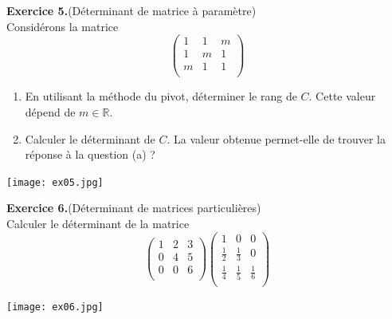 \documentclass[a4paper, 10pt]{report}
\begin{document}
	\noindent
	\textbf{Exercice 5.}(Déterminant de matrice à paramètre)\\
	Considérons la matrice
	\[
	\begin{pmatrix}
		1 & 1 & m\\
		1 & m & 1\\
		m & 1 & 1\\
	\end{pmatrix}
	\]
	\begin{enumerate}[label = (\alph*)]
		\item En utilisant la méthode du pivot, déterminer le rang de $C$.
		Cette valeur dépend de $m \in \mathbb{R}$.
		\item Calculer le déterminant de $C$. La valeur obtenue permet-elle
		de trouver la réponse à la question (a) ?
	\end{enumerate}
	
	\texttt{[image: ex05.jpg]}
	
	\vspace{5mm}
	\noindent
	\textbf{Exercice 6.}(Déterminant de matrices particulières)\\
	Calculer le déterminant de la matrice
	\[
	\begin{pmatrix}
		1 & 2 & 3\\
		0 & 4 & 5\\
		0 & 0 & 6\\
	\end{pmatrix}
	\begin{pmatrix}
		1 & 0 & 0\\
		\tfrac{1}{2} & \tfrac{1}{3} & 0\\
		\tfrac{1}{4} & \tfrac{1}{5} & \tfrac{1}{6}\\
	\end{pmatrix}
	\]
	
	\texttt{[image: ex06.jpg]}
	
	
%	
%	
	
\end{document}
